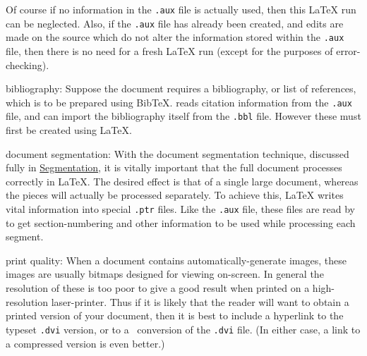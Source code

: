 \begin{htmllist}
\html{\\}\noindent
Of course if no information in the \texttt{.aux} file is actually used,
then this \LaTeX{} run can be neglected.
Also, if the \texttt{.aux} file has already been created, and edits
are made on the source which do not alter the information stored
within the \texttt{.aux} file, then there is no need for a fresh
\LaTeX{} run (except for the purposes of error-checking).


\item[bibliography: ]
Suppose the document requires a bibliography, or list of references,
which is to be prepared using Bib\TeX.
\latextohtml{} reads citation information from the \texttt{.aux} file,
and can import the bibliography itself from the \texttt{.bbl} file.
However these must first be created using \LaTeX.



\item[document segmentation: ]
With the document segmentation technique, 
discussed fully in \hyperref{a later section}{Section~}{}{Segmentation},
it is vitally important that the full document processes correctly
in \LaTeX. The desired effect is that of a single large document,
whereas the pieces will actually be processed separately.
To achieve this, \LaTeX{} writes vital information into special
\texttt{.ptr} files. Like the \texttt{.aux} file, these files
are read by \latextohtml{} to get section-numbering and other
information to be used while processing each segment.


%
\html{\\}\noindent
\item[print quality: ]
When a document contains automatically-generate images, these images
are usually bitmaps designed for viewing on-screen. In general the 
resolution of these is too poor to give a good result when printed
on a high-resolution laser-printer.
Thus if it is likely that the reader will want to obtain
a printed version of your document, then it is best to include
a hyperlink to the typeset \texttt{.dvi} version, 
or to a \PS\ conversion of the \texttt{.dvi} file. 
(In either case, a link to a compressed version is even better.)

\end{htmllist}



